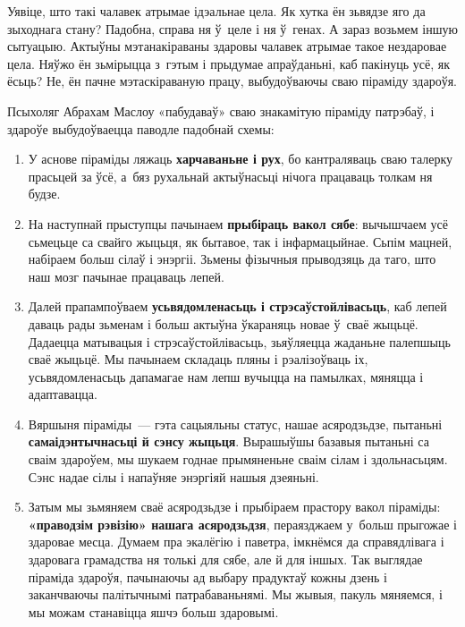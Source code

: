 Уявіце, што такі чалавек атрымае ідэальнае цела. Як хутка ён зьвядзе яго да зыходнага стану? Падобна, справа ня ў~целе і ня ў~генах. А зараз возьмем іншую сытуацыю. Актыўны мэтанакіраваны здаровы чалавек атрымае такое нездаровае цела. Няўжо ён зьмірыцца з~гэтым і прыдумае апраўданьні, каб пакінуць усё, як ёсьць? Не, ён пачне мэтаскіраваную працу, выбудоўваючы сваю піраміду здароўя.

Псыхоляг Абрахам Маслоу «пабудаваў» сваю знакамітую піраміду патрэбаў, і здароўе выбудоўваецца паводле падобнай схемы:

\begin{enumerate}
  \item У аснове піраміды ляжаць \textbf{харчаваньне і рух}, бо кантраляваць сваю талерку прасьцей за ўсё, а~бяз рухальнай актыўнасьці нічога працаваць толкам ня будзе.
  \item На наступнай прыступцы пачынаем \textbf{прыбіраць вакол сябе}: вычышчаем усё сьмецьце са свайго жыцьця, як бытавое, так і інфармацыйнае. Сьпім мацней, набіраем больш сілаў і энэргіі. Зьмены фізычныя прыводзяць да таго, што наш мозг пачынае працаваць лепей.
  \item Далей прапампоўваем \textbf{усьвядомленасьць і стрэсаўстойлівасьць}, каб лепей даваць рады зьменам і больш актыўна ўкараняць новае ў~сваё жыцьцё. Дадаецца матывацыя і стрэсаўстойлівасьць, зьяўляецца жаданьне палепшыць сваё жыцьцё. Мы пачынаем складаць пляны і рэалізоўваць іх, усьвядомленасьць дапамагае нам лепш вучыцца на памылках, мяняцца і адаптавацца.
  \item Вяршыня піраміды~--- гэта сацыяльны статус, нашае асяродзьдзе, пытаньні \textbf{самаідэнтычнасьці й сэнсу жыцьця}. Вырашыўшы базавыя пытаньні са сваім здароўем, мы шукаем годнае прымяненьне сваім сілам і здольнасьцям. Сэнс надае сілы і напаўняе энэргіяй нашыя дзеяньні.
  \item Затым мы зьмяняем сваё асяродзьдзе і прыбіраем прастору вакол піраміды: \textbf{«праводзім рэвізію» нашага асяродзьдзя}, пераязджаем у~больш прыгожае і здаровае месца. Думаем пра экалёгію і паветра, імкнёмся да справядлівага і здаровага грамадства ня толькі для сябе, але й для іншых. Так выглядае піраміда здароўя, пачынаючы ад выбару прадуктаў кожны дзень і заканчваючы палітычнымі патрабаваньнямі. Мы жывыя, пакуль мяняемся, і мы можам станавіцца яшчэ больш здаровымі.
\end{enumerate}


